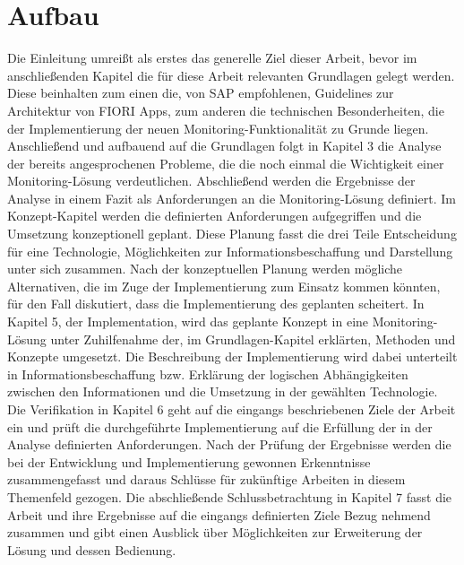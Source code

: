 \section{Aufbau}
Die Einleitung umreißt als erstes das generelle Ziel dieser Arbeit, bevor im anschließenden Kapitel die für diese Arbeit relevanten Grundlagen gelegt werden. Diese beinhalten zum einen die, von SAP empfohlenen, Guidelines zur Architektur von FIORI Apps, zum anderen die technischen Besonderheiten, die der Implementierung der neuen Monitoring-Funktionalität zu Grunde liegen.
Anschließend und aufbauend auf die Grundlagen folgt in Kapitel 3 die Analyse der bereits angesprochenen Probleme, die die noch einmal die Wichtigkeit einer Monitoring-Lösung verdeutlichen. Abschließend werden die Ergebnisse der Analyse in einem Fazit als Anforderungen an die Monitoring-Lösung definiert.
Im Konzept-Kapitel werden die definierten Anforderungen aufgegriffen und die Umsetzung konzeptionell geplant. Diese Planung fasst die drei Teile Entscheidung für eine Technologie, Möglichkeiten zur Informationsbeschaffung und Darstellung unter sich zusammen. Nach der konzeptuellen Planung werden mögliche Alternativen, die im Zuge der Implementierung zum Einsatz kommen könnten, für den Fall diskutiert, dass die Implementierung des geplanten scheitert.
In Kapitel 5, der Implementation, wird das geplante Konzept in eine Monitoring-Lösung unter Zuhilfenahme der, im Grundlagen-Kapitel erklärten, Methoden und Konzepte umgesetzt. Die Beschreibung der Implementierung wird dabei unterteilt in Informationsbeschaffung bzw. Erklärung der logischen Abhängigkeiten zwischen den Informationen und die Umsetzung in der gewählten Technologie.
Die Verifikation in Kapitel 6 geht auf die eingangs beschriebenen Ziele der Arbeit ein und prüft die durchgeführte Implementierung auf die Erfüllung der in der Analyse definierten Anforderungen. Nach der Prüfung der Ergebnisse werden die bei der Entwicklung und Implementierung gewonnen Erkenntnisse zusammengefasst und daraus Schlüsse für zukünftige Arbeiten in diesem Themenfeld gezogen. 
Die abschließende Schlussbetrachtung in Kapitel 7 fasst die Arbeit und ihre Ergebnisse auf die eingangs definierten Ziele Bezug nehmend zusammen und gibt einen Ausblick über Möglichkeiten zur Erweiterung der Lösung und dessen Bedienung.